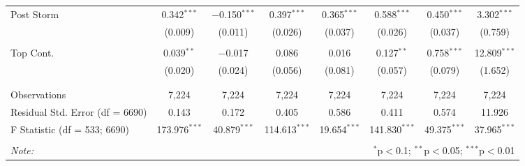 \begin{table}[!htbp]
\begin{tabular}{@{\extracolsep{5pt}}lccccccc}
 Post Storm & 0.342$^{***}$ & $-$0.150$^{***}$ & 0.397$^{***}$ & 0.365$^{***}$ & 0.588$^{***}$ & 0.450$^{***}$ & 3.302$^{***}$ \\ 
  & (0.009) & (0.011) & (0.026) & (0.037) & (0.026) & (0.037) & (0.759) \\ 
  & & & & & & & \\ 
 Top Cont. & 0.039$^{**}$ & $-$0.017 & 0.086 & 0.016 & 0.127$^{**}$ & 0.758$^{***}$ & 12.809$^{***}$ \\ 
  & (0.020) & (0.024) & (0.056) & (0.081) & (0.057) & (0.079) & (1.652) \\ 
  & & & & & & & \\ 
\hline \\[-1.8ex] 
Observations & 7,224 & 7,224 & 7,224 & 7,224 & 7,224 & 7,224 & 7,224 \\ 
Residual Std. Error (df = 6690) & 0.143 & 0.172 & 0.405 & 0.586 & 0.411 & 0.574 & 11.926 \\ 
F Statistic (df = 533; 6690) & 173.976$^{***}$ & 40.879$^{***}$ & 114.613$^{***}$ & 19.654$^{***}$ & 141.830$^{***}$ & 49.375$^{***}$ & 37.965$^{***}$ \\ 
\hline 
\hline \\[-1.8ex] 
\textit{Note:}  & \multicolumn{7}{r}{$^{*}$p$<$0.1; $^{**}$p$<$0.05; $^{***}$p$<$0.01} \\ 
\end{tabular} 
\end{table} 
